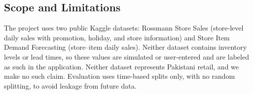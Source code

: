 \subsection{Scope and Limitations}
The project uses two public Kaggle datasets: Rossmann Store Sales (store-level daily sales with promotion, holiday, and store information) and Store Item Demand Forecasting (store--item daily sales). Neither dataset contains inventory levels or lead times, so these values are simulated or user-entered and are labeled as such in the application. Neither dataset represents Pakistani retail, and we make no such claim. Evaluation uses time-based splits only, with no random splitting, to avoid leakage from future data.
